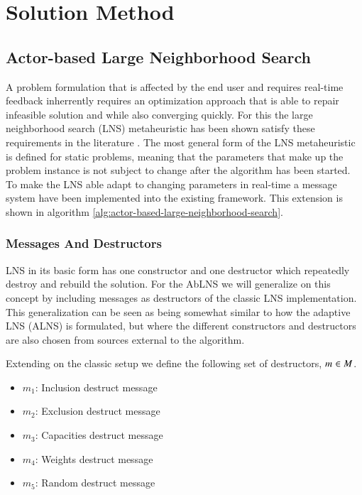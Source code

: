 \section{Solution Method}
\label{sec:2-solution-method}

\subsection{Actor-based Large Neighborhood Search}
A problem formulation that is affected by the end user and requires real-time feedback
inherrently requires an optimization approach that is able to repair infeasible solution
and while also converging quickly. For this the large neighborhood search (LNS)
metaheuristic has been shown satisfy these requirements in the literature
\cite{gendreauHandbookMetaheuristics2019}. The most general form of the LNS metaheuristic
is defined for static problems, meaning that the parameters that make up the problem instance
is not subject to change after the algorithm has been started. To make the
LNS able adapt to changing parameters in real-time a message system have been
implemented into the existing framework. This  extension is shown in algorithm
\ref{alg:actor-based-large-neighborhood-search}.

\subsubsection{Messages And Destructors}
LNS in its basic form has one constructor and one destructor which
repeatedly destroy and rebuild the solution. For the AbLNS we will generalize
on this concept by including messages as destructors of the classic LNS
implementation. This generalization can be seen as being somewhat similar to how
the adaptive LNS (ALNS) is formulated, but where the different constructors and
destructors are also chosen from sources external to the algorithm.

Extending on the classic setup we define the following set of destructors, $m_{}^{} \in M$.
\begin{itemize}
	\item $m_1$: Inclusion destruct message	
	\item $m_2$: Exclusion destruct message	
	\item $m_3$: Capacities destruct message	
	\item $m_4$: Weights destruct message	
	\item $m_5$: Random destruct message
\end{itemize}


